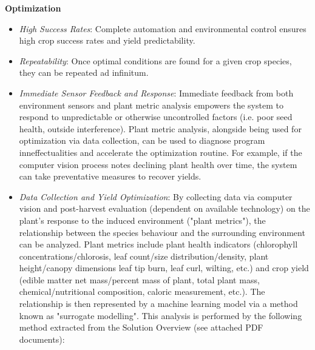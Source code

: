 \documentclass{report}
\begin{document}

\newpage

\textbf{Optimization}




\begin{itemize}
    \item \textit{High Success Rates}: Complete automation and environmental control ensures high crop success rates and yield predictability.
    \item \textit{Repeatability}: Once optimal conditions are found for a given crop species, they can be repeated ad infinitum.
    \item \textit{Immediate Sensor Feedback and Response}: Immediate feedback from both environment sensors and plant metric analysis empowers the system to respond to unpredictable or otherwise uncontrolled factors (i.e. poor seed health, outside interference). Plant metric analysis, alongside being used for optimization via data collection, can be used to diagnose program inneffectualities and accelerate the optimization routine. For example, if the computer vision process notes declining plant health over time, the system can take preventative measures to recover yields.
    \item \textit{Data Collection and Yield Optimization}: By collecting data via computer vision and post-harvest evaluation (dependent on available technology) on the plant's response to the induced environment ("plant metrics"), the relationship between the species behaviour and the surrounding environment can be analyzed. Plant metrics include plant health indicators (chlorophyll concentrations/chlorosis, leaf count/size distribution/density, plant height/canopy dimensions leaf tip burn, leaf curl, wilting, etc.) and crop yield (edible matter net mass/percent mass of plant, total plant mass, chemical/nutritional composition, caloric measurement, etc.). The relationship is then represented by a machine learning model via a method known as "surrogate modelling". This analysis is performed by the following method extracted from the Solution Overview (see attached PDF documents):
    
\end{itemize}
\end{document}
